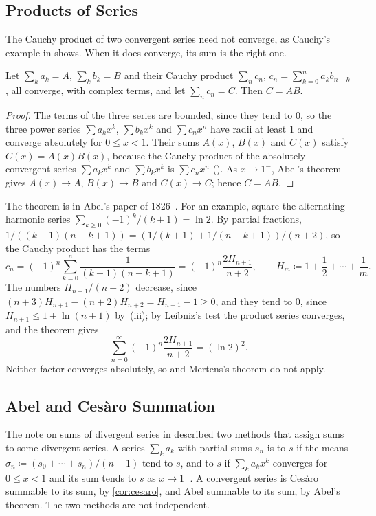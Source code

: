 \subsection{Products of Series}

The Cauchy product of two convergent series need not converge, as Cauchy's example in  shows. When it does converge, its sum is the right one.

\begin{theorem}
\label{thm:abel-product}
Let $\sum_ka_k=A$, $\sum_kb_k=B$ and their Cauchy product $\sum_nc_n$, $c_n=\sum_{k=0}^na_kb_{n-k}$, all converge, with complex terms, and let $\sum_nc_n=C$. Then $C=AB$.
\end{theorem}

\begin{proof}
The terms of the three series are bounded, since they tend to $0$, so the three power series $\sum a_kx^k$, $\sum b_kx^k$ and $\sum c_nx^n$ have radii at least $1$ and converge absolutely for $0\le x<1$. Their sums $A(x)$, $B(x)$ and $C(x)$ satisfy $C(x)=A(x)B(x)$, because the Cauchy product of the absolutely convergent series $\sum a_kx^k$ and $\sum b_kx^k$ is $\sum c_nx^n$ (). As $x\to1^-$, Abel's theorem gives $A(x)\to A$, $B(x)\to B$ and $C(x)\to C$; hence $C=AB$.
\end{proof}

The theorem is in Abel's paper of 1826~\cite{abel1826}. For an example, square the alternating harmonic series $\sum_{k\ge0}(-1)^k/(k+1)=\ln2$. By partial fractions, $1/((k+1)(n-k+1))=(1/(k+1)+1/(n-k+1))/(n+2)$, so the Cauchy product has the terms
\[
c_n=(-1)^n\sum_{k=0}^n\frac1{(k+1)(n-k+1)}=(-1)^n\frac{2H_{n+1}}{n+2},\qquad H_m\coloneqq1+\frac12+\cdots+\frac1m .
\]
The numbers $H_{n+1}/(n+2)$ decrease, since $(n+3)H_{n+1}-(n+2)H_{n+2}=H_{n+1}-1\ge0$, and they tend to $0$, since $H_{n+1}\le1+\ln(n+1)$ by \,(iii); by Leibniz's test the product series converges, and the theorem gives
\[
\sum_{n=0}^\infty(-1)^n\frac{2H_{n+1}}{n+2}=(\ln2)^2 .
\]
Neither factor converges absolutely, so  and Mertens's theorem do not apply.

\subsection{Abel and Ces\`aro Summation}

The note on sums of divergent series in  described two methods that assign sums to some divergent series. A series $\sum_ka_k$ with partial sums $s_n$ is  to $s$ if the means $\sigma_n\coloneqq(s_0+\cdots+s_n)/(n+1)$ tend to $s$, and  to $s$ if $\sum_ka_kx^k$ converges for $0\le x<1$ and its sum tends to $s$ as $x\to1^-$. A convergent series is Ces\`aro summable to its sum, by \cref{cor:cesaro}, and Abel summable to its sum, by Abel's theorem. The two methods are not independent.

